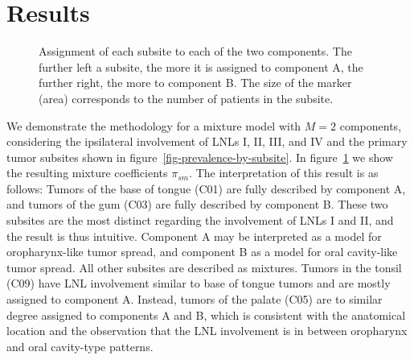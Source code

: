 \documentclass[11pt,twocolumn,twoside]{article}
\begin{document}
\section{Results}\label{sec-results}

\begin{figure}


\caption{\label{fig-cluster-assignments}Assignment of each subsite to
each of the two components. The further left a subsite, the more it is
assigned to component A, the further right, the more to component B. The
size of the marker (area) corresponds to the number of patients in the
subsite.}

\end{figure}%

We demonstrate the methodology for a mixture model with \(M=2\)
components, considering the ipsilateral involvement of LNLs I, II, III,
and IV and the primary tumor subsites shown in
figure~\ref{fig-prevalence-by-subsite}. In
figure~\ref{fig-cluster-assignments} we show the resulting mixture
coefficients \(\pi_{sm}\). The interpretation of this result is as
follows: Tumors of the base of tongue (C01) are fully described by
component A, and tumors of the gum (C03) are fully described by
component B. These two subsites are the most distinct regarding the
involvement of LNLs I and II, and the result is thus intuitive.
Component A may be interpreted as a model for oropharynx-like tumor
spread, and component B as a model for oral cavity-like tumor spread.
All other subsites are described as mixtures. Tumors in the tonsil (C09)
have LNL involvement similar to base of tongue tumors and are mostly
assigned to component A. Instead, tumors of the palate (C05) are to
similar degree assigned to components A and B, which is consistent with
the anatomical location and the observation that the LNL involvement is
in between oropharynx and oral cavity-type patterns.
\end{document}
